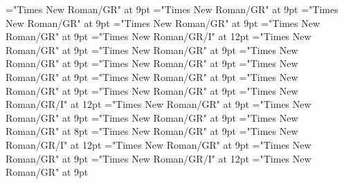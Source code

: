 \documentclass[gps1,twoside]{article}
\begin{document}
\font\spanspanslotsmorphosyntaxanalysissharedgrammaticalinfosensessubentrysubentriesentrybefore="Times New Roman/GR" at 9pt
\font\slotsmorphosyntaxanalysissharedgrammaticalinfosensessubentrysubentriesentrybefore="Times New Roman/GR" at 9pt
\font\spanspannameslotslotsmorphosyntaxanalysissharedgrammaticalinfosensessubentrysubentriesentrybefore="Times New Roman/GR" at 9pt
\font\spannameslotslotsmorphosyntaxanalysissharedgrammaticalinfosensessubentrysubentriesentrylastchildafter="Times New Roman/GR" at 9pt
\font\morphosyntaxanalysissensesensessubentrysubentriesentryafter="Times New Roman/GR" at 9pt
\font\morphosyntaxanalysissensesensessubentrysubentriesentry="Times New Roman/GR/I" at 12pt
\font\spanspanpartofspeechmorphosyntaxanalysissensesensessubentrysubentriesentrybefore="Times New Roman/GR" at 9pt
\font\spanpartofspeechmorphosyntaxanalysissensesensessubentrysubentriesentrylastchildafter="Times New Roman/GR" at 9pt
\font\spanspanslotsmorphosyntaxanalysissensesensessubentrysubentriesentrybefore="Times New Roman/GR" at 9pt
\font\slotsmorphosyntaxanalysissensesensessubentrysubentriesentrybefore="Times New Roman/GR" at 9pt
\font\spanspannameslotslotsmorphosyntaxanalysissensesensessubentrysubentriesentrybefore="Times New Roman/GR" at 9pt
\font\spannameslotslotsmorphosyntaxanalysissensesensessubentrysubentriesentrylastchildafter="Times New Roman/GR" at 9pt
\font\sensetypesensesensessubentrysubentriesentrybefore="Times New Roman/GR" at 9pt
\font\sensetypesensesensessubentrysubentriesentryafter="Times New Roman/GR" at 9pt
\font\sensetypesensesensessubentrysubentriesentry="Times New Roman/GR/I" at 12pt
\font\spanspanabbreviationsensetypesensesensessubentrysubentriesentrybefore="Times New Roman/GR" at 9pt
\font\spanspandefinitionorglosssensesensessubentrysubentriesentrybefore="Times New Roman/GR" at 9pt
\font\spandefinitionorglosssensesensessubentrysubentriesentrylastchildafter="Times New Roman/GR" at 9pt
\font\exampleexampleexamplessensesensessubentrysubentriesentrybefore="Times New Roman/GR" at 8pt
\font\examplessensesensessubentrysubentriesentryafter="Times New Roman/GR" at 9pt
\font\spanbzhexampleexampleexamplessensesensessubentrysubentriesentry="Times New Roman/GR/I" at 12pt
\font\spanspanexampleexampleexamplessensesensessubentrysubentriesentrybefore="Times New Roman/GR" at 9pt
\font\spanexampleexampleexamplessensesensessubentrysubentriesentrylastchildafter="Times New Roman/GR" at 9pt
\font\spanexampleexampleexamplessensesensessubentrysubentriesentry="Times New Roman/GR/I" at 12pt
\font\spanspantranslationtranslationtranslationsexampleexamplessensesensessubentrysubentriesentrybefore="Times New Roman/GR" at 9pt
\end{document}
